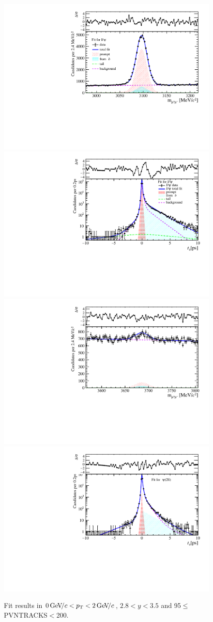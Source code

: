 \begin{figure}[H]
\begin{center}
\includegraphics[width=0.47\linewidth]{pdf/Jpsi/drawmass/n5y2pt1.pdf}
\includegraphics[width=0.47\linewidth]{pdf/Jpsi/2DFit/n5y2pt1.pdf}
\vspace*{-0.5cm}
\includegraphics[width=0.47\linewidth]{pdf/Psi2S/drawmass/n5y2pt1.pdf}
\includegraphics[width=0.47\linewidth]{pdf/Psi2S/2DFit/n5y2pt1.pdf}
\vspace*{-0.5cm}
\end{center}
\caption{Fit results in $0\text{\,Ge\kern -0.1em V\!/}c<p_{\mathrm{T}}<2\text{\,Ge\kern -0.1em V\!/}c$, $2.8<y<3.5$ and 95$\leq$PVNTRACKS$<$200.}
\label{Fitn5y2pt1}
\end{figure}
